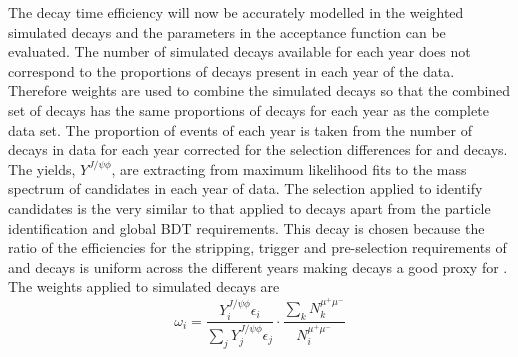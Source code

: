 The decay time efficiency will now be accurately modelled in the weighted simulated \bsmumu decays and the parameters in the acceptance function can be evaluated.  The number of simulated decays available for each year does not correspond to the proportions of decays present in each year of the data. Therefore weights are used to combine the simulated decays so that the combined set of decays has the same proportions of decays for each year as the complete data set. 
The proportion of events of each year is taken from the number of \bsjpsiphi decays in data for each year corrected for the selection differences for \bsmumu and \bsjpsiphi decays. The \bsjpsiphi yields, $Y^{J/\psi \phi}$, are extracting from maximum likelihood fits to the mass spectrum of candidates in each year of data. The selection applied to identify \bsjpisphi candidates is the very similar to that applied to \bsmumu decays apart from the particle identification and global BDT requirements. This decay is chosen because the ratio of the efficiencies for the stripping, trigger and pre-selection requirements of \bsmumu and \bsjpsiphi decays is uniform across the different years making \bsjpsiphi decays a good proxy for \bsmumu. 
The weights applied to simulated \bsmumu decays are
\begin{equation}
\omega_{i}  = \frac{Y_{i}^{J/\psi \phi} \epsilon_{i}}{\displaystyle\sum_{j} Y_{j}^{J/\psi \phi} \epsilon_{j}} \cdot \frac{\displaystyle\sum_{k} N_{k}^{\mu^{+}\mu^{-}}}{N_{i}^{\mu^{+}\mu^{-}}}
\end{equation}
